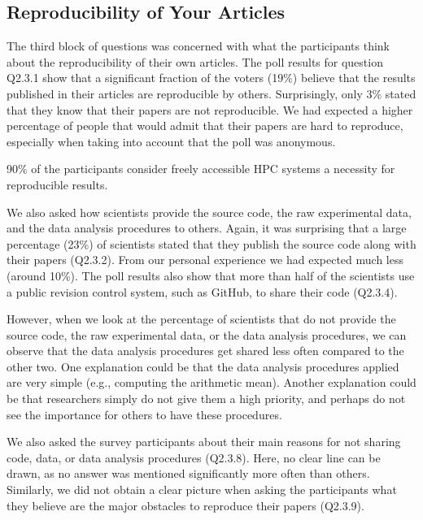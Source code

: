 \documentclass{article}\usepackage[]{graphicx}\usepackage[]{color}
\newcommand{\eg}{e.g.\xspace}
\newcommand{\ques}[2]{Q2.#1.#2\xspace}
\begin{document}
 
\subsection{Reproducibility of Your Articles}
\label{sec:your_articles}


The third block of questions was concerned with what the participants
think about the reproducibility of their own articles.  The poll
results for question \ques{3}{1} show that a significant fraction of
the voters (19\%) believe that the results published in their articles
are reproducible by others. Surprisingly, only 3\% stated that they
know that their papers are not reproducible. We had expected a higher
percentage of people that would admit that their papers are hard to
reproduce, especially when taking into account that the poll was
anonymous.

90\% of the participants consider freely accessible HPC systems a
necessity for reproducible results. 

We also asked how scientists provide the source code, the raw
experimental data, and the data analysis procedures to others. Again,
it was surprising that a large percentage (23\%) of scientists stated
that they publish the source code along with their papers
(\ques{3}{2}). From our personal experience we had expected much less
(around 10\%).  The poll results also show that more than half of the
scientists use a public revision control system, such as GitHub, to
share their code (\ques{3}{4}).

However, when we look at the percentage of scientists that do not
provide the source code, the raw experimental data, or the data
analysis procedures, we can observe that the data analysis procedures
get shared less often compared to the other two. One explanation could
be that the data analysis procedures applied are very simple (\eg,
computing the arithmetic mean). Another explanation could be that
researchers simply do not give them a high priority, and perhaps do
not see the importance for others to have these procedures.

We also asked the survey participants about their main reasons for not
sharing code, data, or data analysis procedures (\ques{3}{8}).  Here,
no clear line can be drawn, as no answer was mentioned significantly
more often than others. Similarly, we did not obtain a clear picture
when asking the participants what they believe are the major obstacles
to reproduce their papers (\ques{3}{9}).
\end{document}
